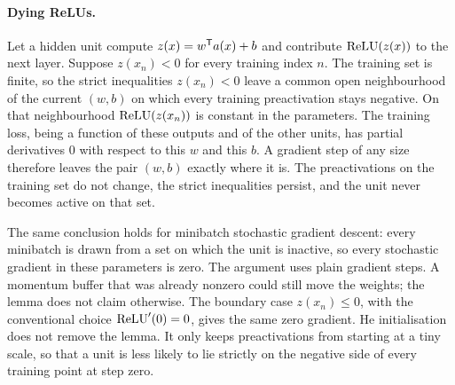 \begin{center}
\label{fig:chain}
\end{center}

\paragraph{Dying ReLUs.}
Let a hidden unit compute \(z(x) = w^{\mathsf{T}} a(x)+b\) and contribute \(\operatorname{ReLU}(z(x))\) to the next layer. Suppose \(z(x_n)<0\) for every training index \(n\). The training set is finite, so the strict inequalities \(z(x_n)<0\) leave a common open neighbourhood of the current \((w,b)\) on which every training preactivation stays negative. On that neighbourhood \(\operatorname{ReLU}(z(x_n))\) is constant in the parameters. The training loss, being a function of these outputs and of the other units, has partial derivatives \(0\) with respect to this \(w\) and this \(b\). A gradient step of any size therefore leaves the pair \((w,b)\) exactly where it is. The preactivations on the training set do not change, the strict inequalities persist, and the unit never becomes active on that set.

The same conclusion holds for minibatch stochastic gradient descent: every minibatch is drawn from a set on which the unit is inactive, so every stochastic gradient in these parameters is zero. The argument uses plain gradient steps. A momentum buffer that was already nonzero could still move the weights; the lemma does not claim otherwise. The boundary case \(z(x_n)\le 0\), with the conventional choice \(\operatorname{ReLU}'(0)=0\), gives the same zero gradient. He initialisation does not remove the lemma. It only keeps preactivations from starting at a tiny scale, so that a unit is less likely to lie strictly on the negative side of every training point at step zero.

